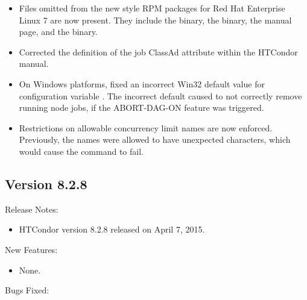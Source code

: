\begin{itemize}
\item Files omitted from the new style RPM packages 
for Red Hat Enterprise Linux 7 are now present.
They include
the  binary, the  binary,
the  manual page, 
and the  binary.

\item Corrected the definition of the job ClassAd attribute 
 within the HTCondor manual.

\item On Windows platforms, fixed an incorrect Win32 default value for
configuration variable .
The incorrect default caused 
to not correctly remove running node jobs,
if the ABORT-DAG-ON feature was triggered.

\item Restrictions on allowable concurrency limit names are now enforced.
Previously, the names were allowed to have unexpected characters, which
would cause the  command to fail.

\end{itemize}

\subsection*{\label{sec:New-8-2-8}Version 8.2.8}

\noindent Release Notes:

\begin{itemize}

\item HTCondor version 8.2.8 released on April 7, 2015.

\end{itemize}


\noindent New Features:

\begin{itemize}

\item None.

\end{itemize}

\noindent Bugs Fixed:

